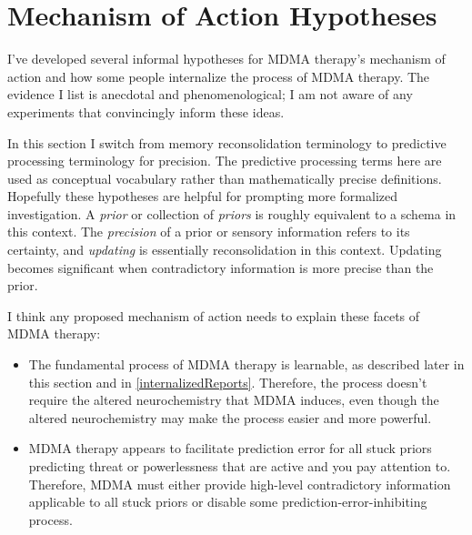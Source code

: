 \documentclass[11pt,oneside]{book}
\begin{document}
\chapter{Mechanism of Action Hypotheses}
\label{ppHypotheses}
I've developed several informal hypotheses for MDMA therapy's mechanism of action and how some people internalize the process of MDMA therapy. The evidence I list is anecdotal and phenomenological; I am not aware of any experiments that convincingly inform these ideas.

In this section I switch from memory reconsolidation terminology to predictive processing terminology for precision. The predictive processing terms here are used as conceptual vocabulary rather than mathematically precise definitions. Hopefully these hypotheses are helpful for prompting more formalized investigation. A \textit{prior} or collection of \textit{priors} is roughly equivalent to a schema in this context. The \textit{precision} of a prior or sensory information refers to its certainty, and \textit{updating} is essentially reconsolidation in this context. Updating becomes significant when contradictory information is more precise than the prior.

I think any proposed mechanism of action needs to explain these facets of MDMA therapy:
\begin{itemize}
    \item The fundamental process of MDMA therapy is learnable, as described later in this section and in \cref{internalizedReports}. Therefore, the process doesn't require the altered neurochemistry that MDMA induces, even though the altered neurochemistry may make the process easier and more powerful.
    \item MDMA therapy appears to facilitate prediction error for all stuck priors predicting threat or powerlessness that are active and you pay attention to. Therefore, MDMA must either provide high-level contradictory information applicable to all stuck priors or disable some prediction-error-inhibiting process.
\end{itemize}
\end{document}
